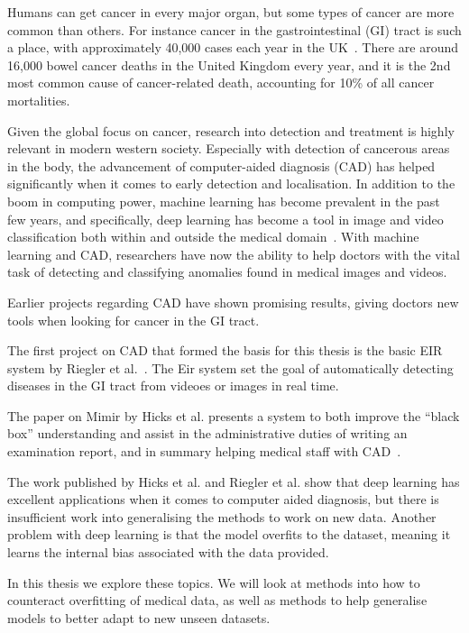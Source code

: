 Humans can get cancer in every major organ, but some types of cancer are more common than others.    
For instance cancer in the gastrointestinal (GI) tract is such a place, with approximately 40,000 cases each year in the UK~\cite{UKCancerBowel}. There are around 16,000 bowel cancer deaths in the United Kingdom every year, and it is the 2nd most common cause of cancer-related death, accounting for 10\% of all cancer mortalities.

Given the global focus on cancer, research into detection and treatment is highly relevant in modern western society. 
Especially with detection of cancerous areas in the body, the advancement of computer-aided diagnosis (CAD) has helped significantly when it comes to early detection and localisation. In addition to the boom in computing power, machine learning has become prevalent in the past few years, and specifically, deep learning has become a tool in image and video classification both within and outside the medical domain~\cite{NIPS2012_4824,DBLP:journals/corr/SimonyanZ14a,DBLP:journals/corr/SimonyanZ14a,DBLP:journals/corr/HeZRS15,DBLP:journals/corr/SzegedyIV16}. 
With machine learning and CAD, researchers have now the ability to help doctors with the vital task of detecting and classifying anomalies found in medical images and videos.

Earlier projects regarding CAD have shown promising results, giving doctors new tools when looking for cancer in the GI tract.

The first project on CAD that formed the basis for this thesis is the basic EIR system by Riegler et al.~\cite{riegler2016eir}.  The Eir system set the goal of automatically detecting diseases in the GI tract from videoes or images in real time. 

The paper on Mimir by Hicks et al. presents a system to both improve the ``black box'' understanding and assist in the administrative duties of writing an examination report, and in summary helping medical staff with CAD~\cite{25953}. 

The work published by Hicks et al. and Riegler et al. show that deep learning has excellent applications when it comes to computer aided diagnosis, but there is insufficient work into generalising the methods to work on new data. Another problem with deep learning is that the model overfits to the dataset, meaning it learns the internal bias associated with the data provided. 

In this thesis we explore these topics. We will look at methods into how to counteract overfitting of medical data, as well as methods to help generalise models to better adapt to new unseen datasets.

